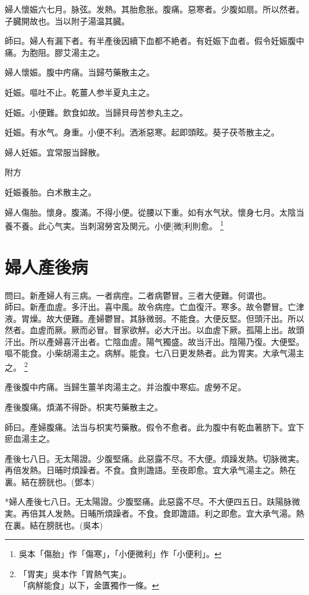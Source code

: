 \documentclass[12pt,twoside,UTF8,b5paper]{ctexbook}
\begin{document}
婦人懷娠六七月。脉弦。发熱。其胎愈胀。腹痛。惡寒者。少腹如扇。所以然者。子臓開故也。当以附子湯温其臓。

師曰。婦人有漏下者。有半產後因續下血都不絶者。有妊娠下血者。假令妊娠腹中痛。为胞阻。膠艾湯主之。

婦人懷娠。腹中㽲痛。当歸芍藥散主之。

妊娠。嘔吐不止。乾薑人参半夏丸主之。

妊娠。小便難。飲食如故。当歸貝母苦参丸主之。

妊娠。有水气。身重。小便不利。洒淅惡寒。起即頭眩。葵子茯苓散主之。

婦人妊娠。宜常服当歸散。

附方

妊娠養胎。白术散主之。

婦人傷胎。懷身。腹滿。不得小便。從腰以下重。如有水气狀。懷身七月。太陰当養不養。此心气実。当刺瀉勞宮及関元。小便[微]利則愈。
	\footnote{吳本「傷胎」作「傷寒」，「小便微利」作「小便利」。}

\chapter{婦人產後病}

問曰。新產婦人有三病。一者病痙。二者病鬱冒。三者大便難。何谓也。\\
師曰。新產血虗。多汗出。喜中風。故令病痙。亡血復汗。寒多。故令鬱冒。亡津液。胃燥。故大便難。產婦鬱冒。其脉微弱。不能食。大便反堅。但頭汗出。所以然者。血虗而厥。厥而必冒。冒家欲觧。必大汗出。以血虗下厥。孤陽上出。故頭汗出。所以產婦喜汗出者。亡陰血虗。陽气獨盛。故当汗出。陰陽乃復。大便堅。嘔不能食。小柴胡湯主之。病觧。能食。七八日更发熱者。此为胃実。大承气湯主之。
	\footnote{「胃実」吳本作「胃熱气実」。\\「病觧能食」以下，金匱獨作一條。}

產後腹中㽲痛。当歸生薑羊肉湯主之。并治腹中寒疝。虗勞不足。

產後腹痛。煩滿不得卧。枳実芍藥散主之。

師曰。產婦腹痛。法当与枳実芍藥散。假令不愈者。此为腹中有乾血著脐下。宜下瘀血湯主之。

產後七八日。无太陽證。少腹堅痛。此惡露不尽。不大便。煩躁发熱。切脉微実。再倍发熱。日晡时煩躁者。不食。食則譫語。至夜即愈。宜大承气湯主之。熱在裏。結在膀胱也。(鄧本)

*婦人產後七八日。无太陽證。少腹堅痛。此惡露不尽。不大便四五日。趺陽脉微実。再倍其人发熱。日晡所煩躁者。不食。食即譫語。利之即愈。宜大承气湯。熱在裏。結在膀胱也。(吳本)
\end{document}
